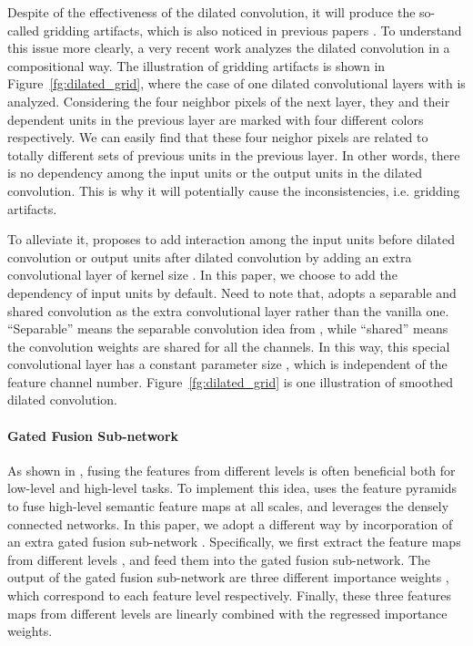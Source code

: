 \documentclass[10pt,twocolumn,letterpaper]{article}
\newcommand{\Fref}[1]{Figure~\ref{#1}}
\begin{document}
Despite of the effectiveness of the dilated convolution, it will produce the so-called gridding artifacts, which is also noticed in previous papers \cite{wang2018understanding,hamaguchi2018effective}. To understand this issue more clearly, a very recent work \cite{wang2018smoothed} analyzes the dilated convolution in a compositional way. The illustration of gridding artifacts is shown in \Fref{fg:dilated_grid}, where the case of one dilated convolutional layers with  is analyzed. Considering the four neighbor pixels of the next layer, they and their dependent units in the previous layer are marked with four different colors respectively. We can easily find that these four neighor pixels are related to totally different sets of previous units in the previous layer. In other words, there is no dependency among the input units or the output units in the dilated convolution. This is why it will potentially cause the inconsistencies, i.e. gridding artifacts.

To alleviate it, \cite{wang2018smoothed} proposes to add interaction among the input units before dilated convolution or output units after dilated convolution by adding an extra convolutional layer of kernel size . In this paper, we choose to add the dependency of input units by default. Need to note that, \cite{wang2018smoothed} adopts a separable and shared convolution as the extra convolutional layer rather than the vanilla one. ``Separable'' means the separable convolution idea from \cite{chollet2017xception}, while ``shared'' means the convolution weights are shared for all the channels. In this way, this special convolutional layer has a constant parameter size , which is independent of the feature channel number. \Fref{fg:dilated_grid} is one illustration of smoothed dilated convolution.

\paragraph{Gated Fusion Sub-network} As shown in \cite{Lin_2017_CVPR,zhang2018densely}, fusing the features from different levels is often beneficial both for low-level and high-level tasks. To implement this idea, \cite{Lin_2017_CVPR} uses the feature pyramids to fuse high-level semantic feature maps at all scales, and \cite{zhang2018densely} leverages the densely connected networks. In this paper, we adopt a different way by incorporation of an extra gated fusion sub-network . Specifically, we first extract the feature maps from different levels , and feed them into the gated fusion sub-network. The output of the gated fusion sub-network are three different importance weights , which correspond to each feature level respectively. Finally, these three  features maps  from different levels are linearly combined with the regressed importance weights.
\end{document}
